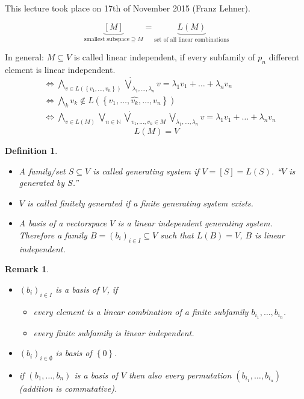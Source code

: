 \documentclass[a4paper,landscape,twocolumn]{article}
\newcommand\meta[3]{This #1 took place on #2 (#3).\par}
\newcommand\set[1]{\left\{#1\right\}}
\newtheorem{defi}{Definition}
\newtheorem{rem}{Remark}
\begin{document}
\meta{lecture}{17th of November 2015}{Franz Lehner}

\[ \underbrace{[M]}_{\text{smallest subspace} \supseteq M} = \underbrace{L(M)}_{\text{set of all linear combinations}} \]

In general: $M \subseteq V$ is called linear independent, if every subfamily of $p_n$ different element is linear independent.
\begin{align*}
  &\Leftrightarrow
     \bigwedge_{v \in L(\set{v_1, \ldots, v_n})}
     \dot\bigvee_{\lambda_1, \ldots, \lambda_n} v
     = \lambda_1 v_1 + \ldots + \lambda_n v_n \\
  &\Leftrightarrow
    \bigwedge_k v_k \not\in L(\set{v_1, \ldots, \hat{v_{k}}, \ldots, v_n}) \\
  &\Leftrightarrow
    \bigwedge_{v \in L(M)}
    \bigvee_{n \in \mathbb N}
    \dot{\bigvee}_{v_1, \ldots, v_n \in M}
    \bigvee_{\lambda_1, \ldots, \lambda_n} v
    = \lambda_1 v_1 + \ldots + \lambda_n v_n
\end{align*}
%
\[ L(M) = V \]
%
\begin{defi}
  \begin{itemize}
    \item A family/set $S \subseteq V$ is called \emph{generating system} if $V = [S] = L(S)$.
      \enquote{$V$ is generated by $S$.}
    \item $V$ is called \emph{finitely generated} if a finite generating system exists.
    \item A \emph{basis} of a vectorspace $V$ is a linear independent generating system.
      Therefore a family $B = (b_i)_{i \in I} \subseteq V$ such that $L(B) = V$, $B$ is linear independent.
  \end{itemize}
\end{defi}

\begin{rem}
  \begin{itemize}
    \item
      $(b_i)_{i \in I}$ is a basis of $V$, if
      \begin{itemize}
        \item every element is a linear combination of a finite subfamily $b_{i_1}, \ldots, b_{i_n}$.
        \item every finite subfamily is linear independent.
      \end{itemize}
    \item
      $(b_i)_{i \in \emptyset}$ is basis of $\set{0}$.
    \item
      if $(b_1, \ldots, b_n)$ is a basis of $V$ then also every permutation $(b_{i_1}, \ldots, b_{i_n})$ (addition is commutative).
  \end{itemize}
\end{rem}
\end{document}
